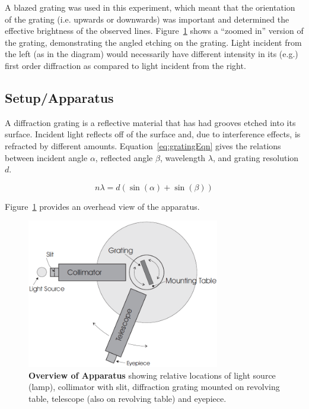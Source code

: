 \documentclass[paper=a4, fontsize=11pt]{scrartcl} %
\numberwithin{equation}{section}
\numberwithin{figure}{section}
\numberwithin{table}{section}
\begin{document}
A blazed grating was used in this experiment, which meant that the orientation of the grating (i.e. upwards or downwards) was important and determined the effective brightness of the observed lines. Figure~\ref{fig:diagram1} shows a ``zoomed in'' version of the grating, demonstrating the angled etching on the grating. Light incident from the left (as in the diagram) would necessarily have different intensity in its (e.g.) first order diffraction as compared to light incident from the right.


\subsection{Setup/Apparatus}

A diffraction grating is a reflective material that has had grooves etched into its surface. Incident light reflects off of the surface and, due to interference effects, is refracted by different amounts. Equation~\ref{eq:gratingEqn} gives the relations between incident angle $\alpha$, reflected angle $\beta$, wavelength $\lambda$, and grating resolution $d$.

\begin{equation} \label{eq:gratingEqn}
n \lambda = d ( \sin(\alpha) + \sin(\beta))
\end{equation}

Figure~\ref{fig:diagram1} provides an overhead view of the apparatus.


\begin{figure}[H] \begin{center}
  \includegraphics[height=65mm]{diagram1.png}
  \caption{\textbf{Overview of Apparatus} showing relative locations of light source (lamp), collimator with slit, diffraction grating mounted on revolving table, telescope (also on revolving table) and eyepiece.}
  \label{fig:diagram1}
\end{center} \end{figure}
\end{document}
